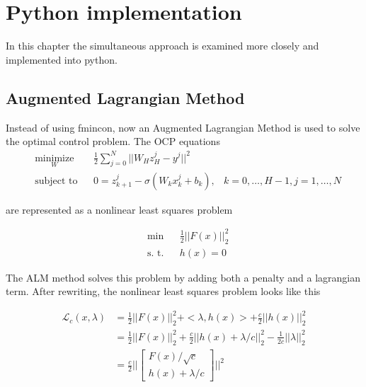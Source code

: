 \chapter{Python implementation}
\label{cha:2}
In this chapter the simultaneous approach is examined more closely and implemented into python.

\section{Augmented Lagrangian Method}
Instead of using fmincon, now an Augmented Lagrangian Method is used to solve the optimal control problem. The OCP equations
\begin{equation*}
	\begin{aligned}
	& \underset{W}{\text{minimize}}
	& & \frac{1}{2}\sum\limits_{j=0}^{N}||W_Hz_H^j - y^j||^2 \\
	& \text{subject to}
	& & 0  = z_{k+1}^j - \sigma(W_kx_k^j + b_k), &k = 0,\ldots,H-1,j = 1,\ldots,N
	\end{aligned}
\end{equation*}

are represented as a nonlinear least squares problem

\begin{equation*}
	\begin{aligned}
	& \text{min}
	&  & \frac{1}{2} ||F(x)||^2_2 \\
	& \text{s. t.}
	& &  h(x) = 0
	\end{aligned}
\end{equation*}

The ALM method solves this problem by adding both a penalty and a lagrangian term. After rewriting, the nonlinear least squares problem looks like this

\begin{equation*}
	\begin{aligned}
		\mathcal{L}_c(x,\lambda)
		&= \frac{1}{2} ||F(x)||^2_2 + <\lambda,h(x)> + \frac{c}{2} || h(x) ||^2_2 \\
		&= \frac{1}{2} ||F(x)||^2_2 + \frac{c}{2} ||h(x) + \lambda/c ||^2_2 - \frac{1}{2c} ||\lambda||^2_2 \\
		&= \frac{c}{2} \Big|\Big|
		\begin{bmatrix}
			F(x)/\sqrt{c} \\
			h(x) + \lambda/c
		\end{bmatrix} \Big|\Big|^2
	\end{aligned}
\end{equation*}

